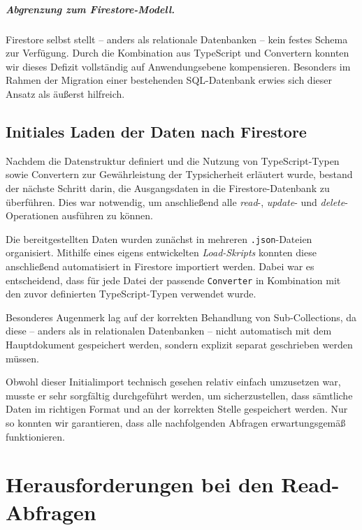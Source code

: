 \documentclass[12pt,a4paper%
              ,oneside     %
              ,titlepage
              ,DIV=13
              ,headinclude
              ,footinclude=false%
              ,cleardoublepage=empty%
              ,parskip=half,
              BCOR=0mm,
              ]{scrreprt}
\begin{document}
\paragraph{\textbf{Abgrenzung zum Firestore-Modell.}} Firestore selbst stellt – anders als relationale Datenbanken – kein festes Schema zur Verfügung. Durch die Kombination aus TypeScript und Convertern konnten wir dieses Defizit vollständig auf Anwendungsebene kompensieren. Besonders im Rahmen der Migration einer bestehenden SQL-Datenbank erwies sich dieser Ansatz als äußerst hilfreich.

\section{Initiales Laden der Daten nach Firestore}

Nachdem die Datenstruktur definiert und die Nutzung von TypeScript-Typen sowie Convertern zur Gewährleistung der Typsicherheit erläutert wurde, bestand der nächste Schritt darin, die Ausgangsdaten in die Firestore-Datenbank zu überführen. Dies war notwendig, um anschließend alle \textit{read}-, \textit{update}- und \textit{delete}-Operationen ausführen zu können.

Die bereitgestellten Daten wurden zunächst in mehreren \texttt{.json}-Dateien organisiert. Mithilfe eines eigens entwickelten \textit{Load-Skripts} konnten diese anschließend automatisiert in Firestore importiert werden. Dabei war es entscheidend, dass für jede Datei der passende \texttt{Converter} in Kombination mit den zuvor definierten TypeScript-Typen verwendet wurde.

Besonderes Augenmerk lag auf der korrekten Behandlung von Sub-Collections, da diese – anders als in relationalen Datenbanken – nicht automatisch mit dem Hauptdokument gespeichert werden, sondern explizit separat geschrieben werden müssen.

Obwohl dieser Initialimport technisch gesehen relativ einfach umzusetzen war, musste er sehr sorgfältig durchgeführt werden, um sicherzustellen, dass sämtliche Daten im richtigen Format und an der korrekten Stelle gespeichert werden. Nur so konnten wir garantieren, dass alle nachfolgenden Abfragen erwartungsgemäß funktionieren.

\chapter{Herausforderungen bei den Read-Abfragen}
\end{document}
